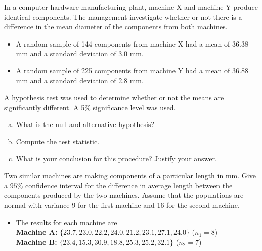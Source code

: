 \item 
In a computer hardware manufacturing plant, machine X and machine Y
produce identical components. The management investigate whether or
not there is a difference in the mean diameter of the components from
both machines.
\begin{itemize}
\item A random sample of 144 components from machine X had a mean of
36.38 mm and a standard deviation of 3.0 mm.
\item  A random sample of 225 components from machine Y had a mean of
36.88 mm and a standard deviation of 2.8 mm.
\end{itemize}
A hypothesis test was used to determine whether or not the means are
significantly different. A 5\% significance level was used.
\begin{enumerate}[(a)]
\item What is the null and alternative hypothesis?
\item Compute the test statistic.
\item What is your conclusion for this procedure? Justify your
answer.
\end{enumerate}

	\item Two similar machines are making components of a particular length
	in mm. Give a $95\%$ confidence interval for the difference in average length between
	the components produced by the two machines. Assume that the populations are normal
	with variance 9 for the first machine and 16 for the second machine.
	\begin{itemize}
	\item The results for each machine are\\ \bigskip
	\textbf{Machine A:} $\{ 23.7, 23.0, 22.2, 24.0, 21.2, 23.1, 27.1, 24.0 \}   $ ($n_1= 8$)\\ \bigskip
	\textbf{Machine B:} $\{23.4, 15.3, 30.9, 18.8, 25.3, 25.2, 32.1\}$  ($n_2=7$) \\
\end{itemize}


